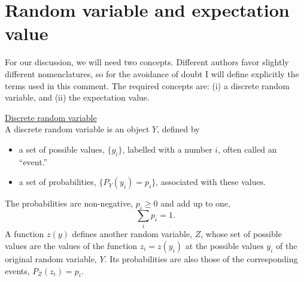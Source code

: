 \documentclass[pdftex]{article}
\newcommand{\bi}{\begin{itemize}}
\newcommand{\ei}{\end{itemize}}
\newcommand{\seclabel}[1]{\label{section:#1}}
\newcommand{\be}{\begin{equation}}
\newcommand{\ee}{\end{equation}}
\begin{document}
\section{Random variable and expectation value}
\seclabel{Mathematical}
For our discussion, we will need two concepts. Different authors favor slightly different nomenclatures, so for the avoidance of doubt I will define explicitly the terms used in this comment. The required concepts are: (i) a discrete random variable, and (ii) the expectation value. 

\underline{Discrete random variable}\\
A discrete random variable is an object $Y$, defined by 
\bi
\item
a set of possible values, $\{y_i\}$, labelled with a number $i$, often called an ``event.'' 
\item
a set of probabilities, $\{P_Y(y_i)=p_i\}$, associated with these values.
\ei
The probabilities are non-negative, $p_i\geq0$ and add up to one,
\be
\sum_i p_i =1.
\ee
A function $z(y)$ defines another random variable, $Z$, whose set of possible values are the values of the function $z_i=z(y_i)$ at the possible values $y_i$ of the original random variable, $Y$. Its probabilities are also those of the corresponding events, $P_Z(z_i)=p_i$.
\end{document}
